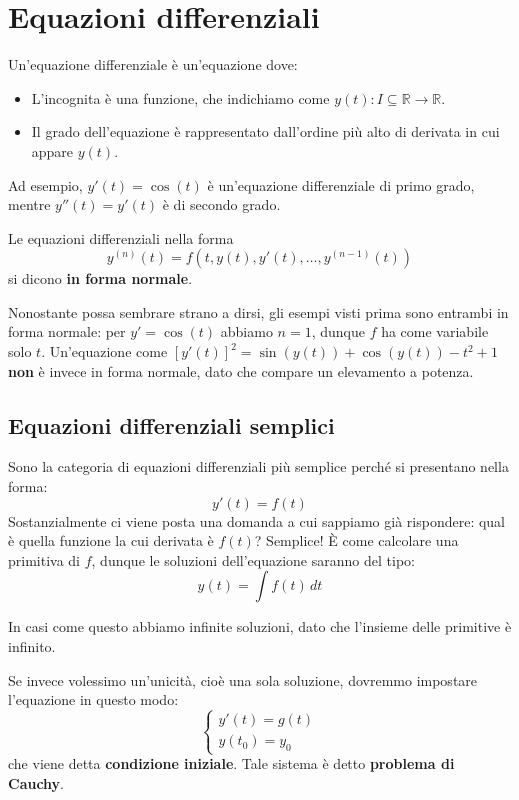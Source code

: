 \documentclass[12pt]{report}
\newcommand{\R}{\mathbb{R}}
\begin{document}
	\chapter{Equazioni differenziali}
	
	Un'equazione differenziale è un'equazione dove:
	\begin{itemize}
		
		\item L'incognita è una funzione, che indichiamo come $y(t): I \subseteq \R \to \R$.
		
		\item Il grado dell'equazione è rappresentato dall'ordine più alto di derivata in cui appare $y(t)$.
		
	\end{itemize}
	Ad esempio, $y'(t) = \cos(t)$ è un'equazione differenziale di primo grado, mentre $y''(t) = y'(t)$ è di secondo grado.
	
	Le equazioni differenziali nella forma
	\[
	y^{(n)}(t) = f(t, y(t), y'(t), \dots, y^{(n-1)}(t))
	\]
	si dicono \textbf{in forma normale}.
	
	Nonostante possa sembrare strano a dirsi, gli esempi visti prima sono entrambi in forma normale: per $y' = \cos(t)$ abbiamo $n=1$, dunque $f$ ha come variabile solo $t$. Un'equazione come $[y'(t)]^2 = \sin(y(t)) + \cos(y(t)) - t^2 + 1$ \textbf{non} è invece in forma normale, dato che compare un elevamento a potenza.
	
	\section{Equazioni differenziali semplici}
	Sono la categoria di equazioni differenziali più semplice perché si presentano nella forma:
	\[
	y'(t) = f(t)
	\]
	Sostanzialmente ci viene posta una domanda a cui sappiamo già rispondere: qual è quella funzione la cui derivata è $f(t)$?
	Semplice! È come calcolare una primitiva di $f$, dunque le soluzioni dell'equazione saranno del tipo:
	\[
	y(t) = \int f(t) \, dt
	\]
	\begin{osservazione}{}{}
		
		In casi come questo abbiamo infinite soluzioni, dato che l'insieme delle primitive è infinito.
		
	\end{osservazione}
	
	Se invece volessimo un'unicità, cioè una sola soluzione, dovremmo impostare l'equazione in questo modo:
	\[
	\begin{cases}
		y'(t) = g(t)\\
		y(t_0) = y_0
	\end{cases}
	\]
	che viene detta \textbf{condizione iniziale}. Tale sistema è detto \textbf{problema di Cauchy}.
	
\end{document}
